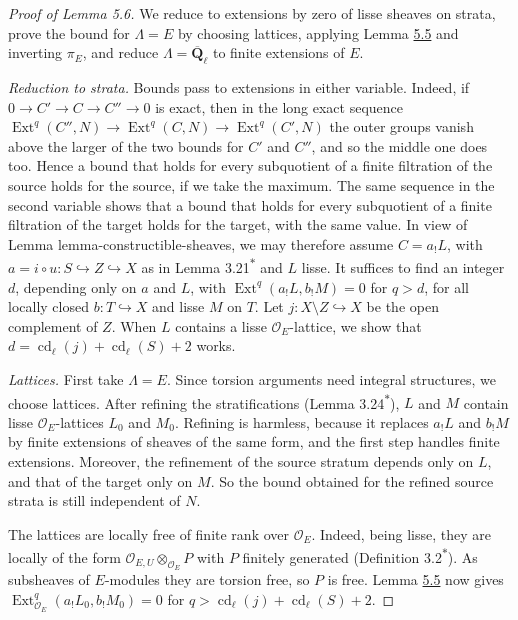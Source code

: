 \documentclass[11pt]{article}
\newcommand{\bpout}[1]{#1\textsuperscript{\hyperlink{bp-outside}{\ensuremath{\ast}}}}
\providecommand{\Ext}{}\renewcommand{\Ext}{\operatorname{Ext}}
\begin{document}
\begin{proof}[{Proof of Lemma 5.6}]\label{bp22}%
We reduce to extensions by zero of lisse sheaves on strata, prove the bound for \(\Lambda=E\) by choosing lattices, applying Lemma \hyperref[bp18]{5.5} and inverting \(\pi_E\), and reduce \(\Lambda=\overline{\mathbf Q}_\ell\) to finite extensions of \(E\).

\emph{Reduction to strata.} Bounds pass to extensions in either variable. Indeed, if \(0\to C'\to C\to C''\to0\) is exact, then in the long exact sequence \(\Ext^q(C'',N)\to\Ext^q(C,N)\to\Ext^q(C',N)\) the outer groups vanish above the larger of the two bounds for \(C'\) and \(C''\), and so the middle one does too. Hence a bound that holds for every subquotient of a finite filtration of the source holds for the source, if we take the maximum. The same sequence in the second variable shows that a bound that holds for every subquotient of a finite filtration of the target holds for the target, with the same value. In view of Lemma lemma-constructible-sheaves, we may therefore assume \(C=a_!L\), with \(a=i\circ u:S\hookrightarrow Z\hookrightarrow X\) as in Lemma \bpout{3.21} and \(L\) lisse. It suffices to find an integer \(d\), depending only on \(a\) and \(L\), with \(\Ext^q(a_!L,b_!M)=0\) for \(q>d\), for all locally closed \(b:T\hookrightarrow X\) and lisse \(M\) on \(T\). Let \(j:X\setminus Z\hookrightarrow X\) be the open complement of \(Z\). When \(L\) contains a lisse \(\mathcal O_E\)-lattice, we show that \(d=\operatorname{cd}_\ell(j)+\operatorname{cd}_\ell(S)+2\) works.

\emph{Lattices.} First take \(\Lambda=E\). Since torsion arguments need integral structures, we choose lattices. After refining the stratifications (Lemma \bpout{3.24}), \(L\) and \(M\) contain lisse \(\mathcal O_E\)-lattices \(L_0\) and \(M_0\). Refining is harmless, because it replaces \(a_!L\) and \(b_!M\) by finite extensions of sheaves of the same form, and the first step handles finite extensions. Moreover, the refinement of the source stratum depends only on \(L\), and that of the target only on \(M\). So the bound obtained for the refined source strata is still independent of \(N\).

The lattices are locally free of finite rank over \(\mathcal O_E\). Indeed, being lisse, they are locally of the form \(\mathcal O_{E,U}\otimes_{\mathcal O_E}P\) with \(P\) finitely generated (Definition \bpout{3.2}). As subsheaves of \(E\)-modules they are torsion free, so \(P\) is free. Lemma \hyperref[bp18]{5.5} now gives \(\Ext^q_{\mathcal O_E}(a_!L_0,b_!M_0)=0\) for \(q>\operatorname{cd}_\ell(j)+\operatorname{cd}_\ell(S)+2\).


\end{proof}
\end{document}
